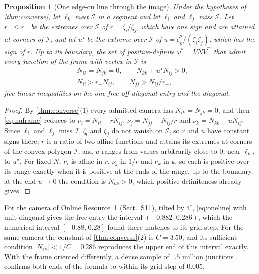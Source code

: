 \documentclass[pdflatex,sn-mathphys-num,iicol]{sn-jnl}
\newcommand{\OR}{Online Resource~1}
\theoremstyle{thmstyleone}
\newtheorem{proposition}[theorem]{Proposition}
\theoremstyle{thmstylethree}
\theoremstyle{thmstyletwo}
\begin{document}
\begin{proposition}[One edge-on line through the image]\label{prop:oneline}
Under the hypotheses of \cref{thm:converse}, let $\ell_k$ meet $\mathcal I$ in a segment and let $\ell_i$ and $\ell_j$ miss $\mathcal I$. Let $r_-\le r_+$ be the extremes over $\mathcal I$ of $r=\zeta_i/\zeta_j$, which have one sign and are attained at corners of $\mathcal I$, and let $u^{\star}$ be the extreme over $\mathcal I$ of $u=\zeta_k^2/(\zeta_i\zeta_j)$, which has the sign of $r$. Up to its boundary, the set of positive-definite $\omega^{*}=VNV^{\top}$ that admit every junction of the frame with vertex in $\mathcal I$ is
\begin{equation}
\begin{aligned}
&N_{ik}=N_{jk}=0,\qquad N_{kk}+u^{\star}N_{ij}>0,\\
&N_{ii}>r_{\pm}N_{ij},\qquad N_{jj}>N_{ij}/r_{\pm},
\end{aligned}
\label{eq:oneline}
\end{equation}
five linear inequalities on the one free off-diagonal entry and the diagonal.
\end{proposition}
\begin{proof}
By \cref{thm:converse}(1) every admitted camera has $N_{ik}=N_{jk}=0$, and then \eqref{eq:nuframe} reduces to $\nu_i=N_{ii}-rN_{ij}$, $\nu_j=N_{jj}-N_{ij}/r$ and $\nu_k=N_{kk}+uN_{ij}$. Since $\ell_i$ and $\ell_j$ miss $\mathcal I$, $\zeta_i$ and $\zeta_j$ do not vanish on $\mathcal I$, so $r$ and $u$ have constant signs there, $r$ is a ratio of two affine functions and attains its extremes at corners of the convex polygon $\mathcal I$, and $u$ ranges from values arbitrarily close to $0$, near $\ell_k$, to $u^{\star}$. For fixed $N$, $\nu_i$ is affine in $r$, $\nu_j$ in $1/r$ and $\nu_k$ in $u$, so each is positive over its range exactly when it is positive at the ends of the range, up to the boundary; at the end $u\to0$ the condition is $N_{kk}>0$, which positive-definiteness already gives.
\end{proof}

For the camera of \OR{} (Sect.~S11), tilted by $4^\circ$, \eqref{eq:oneline} with unit diagonal gives the free entry the interval $(-0.882,\,0.286)$, which the numerical interval $[-0.88,\,0.28]$ found there matches to its grid step. For the same camera the constant of \cref{thm:converse}(2) is $C=3.50$, and its sufficient condition $|N_{12}|<1/C=0.286$ reproduces the upper end of this interval exactly. With the frame oriented differently, a dense sample of $1.5$ million junctions confirms both ends of the formula to within its grid step of $0.005$.
\end{document}
